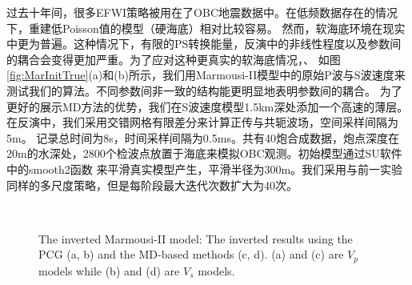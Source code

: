 过去十年间，很多EFWI策略被用在了OBC地震数据中。在低频数据存在的情况下，重建低Poisson值的模型（硬海底）相对比较容易\cite[]{bae:2012}。
然而，软海底环境在现实中更为普遍。这种情况下，有限的PS转换能量，反演中的非线性程度以及参数间的耦合会变得更加严重。为了应对这种更真实的软海底情况，、
如图\ref{fig:MarInitTrue}(a)和(b)所示，我们用Marmousi-II模型中的原始P波与S波速度来测试我们的算法。不同参数间非一致的结构能更明显地表明参数间的耦合。
为了更好的展示MD方法的优势，我们在S波速度模型1.5km深处添加一个高速的薄层。在反演中，我们采用交错网格有限差分来计算正传与共轭波场，空间采样间隔为5m。
记录总时间为8s，时间采样间隔为0.5ms。共有40炮合成数据，炮点深度在20m的水深处，2800个检波点放置于海底来模拟OBC观测。初始模型通过SU软件中的smooth2函数
来平滑真实模型产生，平滑半径为300m。我们采用与前一实验同样的多尺度策略，但是每阶段最大迭代次数扩大为40次。
\begin{figure}
    \begin{center}
		\\
        \caption{
        The inverted Marmousi-II model: The inverted results using the PCG (a, b)
            and the MD-based methods (c, d).
        (a) and (c) are $V_p$ models while (b) and (d) are $V_s$ models.
    }
    \label{fig:MarInvert}
    \end{center}
\end{figure}

